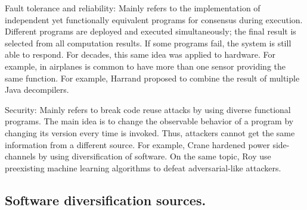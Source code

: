 \begin{goal}{Fault tolerance and reliability:}
    \label{goal:reliability}
    \normalfont
    Mainly refers to the implementation of independent yet functionally equivalent programs for consensus during execution. Different programs are deployed and executed simultaneously; the final result is selected from all computation results. If some programs fail, the system is still able to respond. For decades, this same idea was applied to hardware. For example, in airplanes is common to have more than one sensor providing the same function. For example, Harrand \etal \cite{harrand2020java} proposed to combine the result of multiple Java decompilers.
\end{goal}

\begin{goal}{Security:}
    \label{goal:security}    
    \normalfont
    Mainly refers to break code reuse attacks \cite{595185} by using diverse functional programs. The main idea is to change the observable behavior of a program by changing its version every time is invoked. Thus, attackers cannot get the same information from a different source. For example, Crane \etal \cite{crane2015thwarting} hardened power side-channels by using diversification of software. On the same topic, Roy \etal \cite{10.1145/3318216.3363338} use preexisting machine learning algorithms to defeat adversarial-like attackers.
\end{goal} 







\subsection*{Software diversification sources.}

